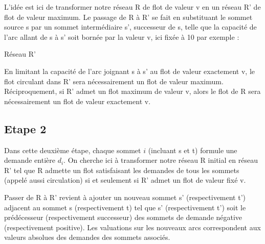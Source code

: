 \documentclass[letterpaper,12pt]{article}
\begin{document}
L'idée est ici de transformer notre réseau R de flot de valeur v en un réseau R' de flot de valeur maximum.
Le passage de R à R' se fait en substituant le sommet source s par un sommet intermédiaire s', successeur de s, telle que la capacité de l'arc allant de s à s' soit bornée par la valeur v, ici fixée à 10 par exemple :
\hfill \break

\begin{center}

Réseau R'

\end{center}
\hfill \break
En limitant la capacité de l'arc joignant s à s' au flot de valeur exactement v, le flot circulant dans R' sera nécessairement un flot de valeur maximum. Réciproquement, si R' admet un flot maximum de valeur v, alors le flot de R sera nécessairement un flot de valeur exactement v.

\subsection{Etape 2}

Dans cette deuxième étape, chaque sommet $i$ (incluant s et t) formule une demande entière $d_i$.
On cherche ici à transformer notre réseau R initial en réseau R' tel que R admette un flot satisfaisant les demandes de tous les sommets (appelé aussi circulation) si et seulement si R' admet un flot de valeur fixé v. 

Passer de R à R' revient à ajouter un nouveau sommet s' (respectivement t') adjacent au sommet s (respectivement t) tel que s' (respectivement t') soit le prédécesseur (respectivement successeur) des sommets de demande négative (respectivement positive). Les valuations sur les nouveaux arcs correspondent aux valeurs absolues des demandes des sommets associés.
\end{document}
